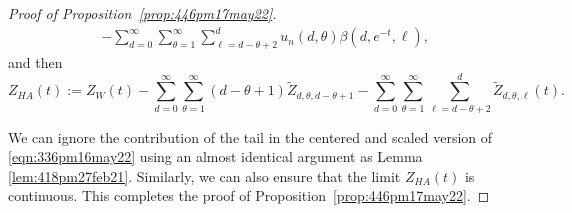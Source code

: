 \documentclass[11pt]{article}
\newcommand{\cA}{\mathcal{A}}
\begin{document}
\begin{proof}[Proof of Proposition~\ref{prop:446pm17may22}]
\begin{equation}
\begin{aligned}
     &-\sum_{d=0}^{\infty}\sum_{\theta=1}^{\infty}\sum_{\ell=d-\theta+2}^{d}u_n(d,\theta) \beta(d,e^{-t},\ell),
     \end{aligned}
\end{equation}
and then
\begin{equation}
\label{eqn:911pm16may22}
    Z_{HA}(t):= Z_W(t)-\sum_{d=0}^{\infty}\sum_{\theta=1}^{\infty}(d-\theta+1)\widetilde{Z}_{d,\theta,d-\theta+1} -  \sum_{d=0}^{\infty}\sum_{\theta=1}^{\infty}\sum_{ \ell= d-\theta+2}^d \widetilde{Z}_{d,\theta,\ell}(t).
\end{equation}

We can ignore the contribution of the tail in the centered and scaled version of \eqref{eqn:336pm16may22} using an almost identical argument as Lemma \ref{lem:418pm27feb21}. Similarly, we can also ensure that the limit $Z_{HA}(t)$ is continuous. This completes the proof of Proposition~\ref{prop:446pm17may22}. 
\end{proof}






%
\end{document}
